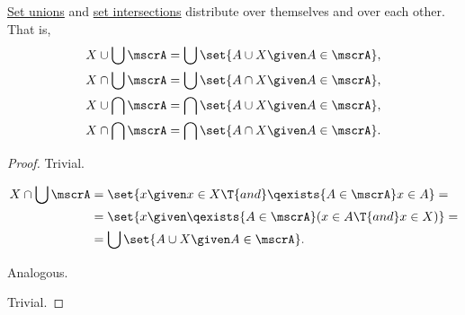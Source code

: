 \begin{proposition}\label{thm:union_intersection_distributivity}
  \hyperref[def:set_union]{Set unions} and \hyperref[def:set_intersection]{set intersections} distribute over themselves and over each other. That is,
  \begin{align}
    X \cup \bigcup \mscrA &= \bigcup \set{ A \cup X \given A \in \mscrA }, \label{eq:thm:union_intersection_distributivity/union_over_union} \\
    X \cap \bigcup \mscrA &= \bigcup \set{ A \cap X \given A \in \mscrA }, \label{eq:thm:union_intersection_distributivity/intersection_over_union} \\
    X \cup \bigcap \mscrA &= \bigcap \set{ A \cup X \given A \in \mscrA }, \label{eq:thm:union_intersection_distributivity/union_over_intersection} \\
    X \cap \bigcap \mscrA &= \bigcap \set{ A \cap X \given A \in \mscrA }. \label{eq:thm:union_intersection_distributivity/intersection_over_intersection}
  \end{align}
\end{proposition}
\begin{proof}
   Trivial.

  \begin{align*}
    X \cap \bigcup \mscrA
    &=
    \set{ x \given x \in X \T{and} \qexists{A \in \mscrA} x \in A }
    = \\ &=
    \set{ x \given \qexists{A \in \mscrA} (x \in A \T{and} x \in X) }
    = \\ &=
    \bigcup \set{ A \cup X \given A \in \mscrA }.
  \end{align*}

   Analogous.

   Trivial.
\end{proof}

